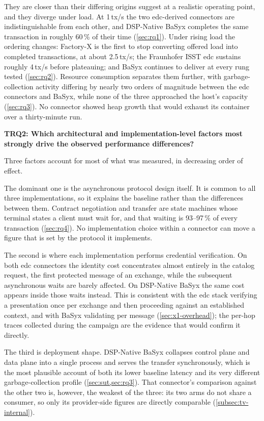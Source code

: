 They are closer than their differing origins suggest at a realistic operating point, and
they diverge under load. At 1\,tx/s the two \gls{edc}-derived connectors are
indistinguishable from each other, and DSP-Native BaSyx completes the same transaction in
roughly 60\,\% of their time (\cref{sec:rq1}). Under rising load the ordering changes:
Factory-X is the first to stop converting offered load into completed transactions, at
about 2.5\,tx/s; the Fraunhofer ISST \gls{edc} sustains roughly 4\,tx/s before plateauing;
and BaSyx continues to deliver at every rung tested (\cref{sec:rq2}). Resource consumption
separates them further, with garbage-collection activity differing by nearly two orders of
magnitude between the \gls{edc} connectors and BaSyx, while none of the three approached
the host's capacity (\cref{sec:rq3}). No connector showed heap growth that would exhaust
its container over a thirty-minute run.

\textbf{TRQ2: Which architectural and implementation-level factors most strongly drive
the observed performance differences?}

Three factors account for most of what was measured, in decreasing order of effect.

The dominant one is the asynchronous protocol design itself. It is common to all
three implementations, so it explains the baseline rather than the differences between
them. Contract negotiation and transfer are state machines whose terminal states a client
must wait for, and that waiting is 93--97\,\% of every transaction (\cref{sec:rq4}). No implementation choice within a connector can move a figure that is
set by the protocol it implements.

The second is where each implementation performs credential verification. On both
\gls{edc} connectors the identity cost concentrates almost entirely in the catalog request, the first protected message of an exchange, while the subsequent asynchronous waits
are barely affected. On DSP-Native BaSyx the same cost appears inside those waits instead.
This is consistent with the \gls{edc} stack verifying a presentation once per exchange and
then proceeding against an established context, and with BaSyx validating per message
(\cref{sec:x1-overhead}); the per-hop traces collected during the campaign are the
evidence that would confirm it directly.

The third is deployment shape. DSP-Native BaSyx collapses control plane and data
plane into a single process and serves the transfer synchronously, which is the most
plausible account of both its lower baseline latency and its very different
garbage-collection profile (\cref{sec:sut,sec:rq3}). That connector's comparison against
the other two is, however, the weakest of the three: its two arms do not share a consumer,
so only its provider-side figures are directly comparable (\cref{subsec:tv-internal}).


